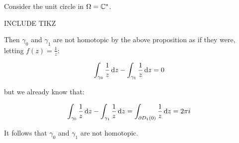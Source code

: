 \begin{example}
Consider the unit circle in $\Omega = \mathbb{C}^*$.

INCLUDE TIKZ

Then $\gamma_0$ and $\gamma_1$ are not homotopic by the above proposition as if they were, letting $f(z) = \frac{1}{z}$:

\begin{align*}
    \int_{\gamma_0} \frac{1}{z} \dif z - \int_{\gamma_1} \frac{1}{z} \dif z = 0
\end{align*}

but we already know that:

\begin{align*}
    \int_{\gamma_0} \frac{1}{z} \dif z - \int_{\gamma_1} \frac{1}{z} \dif z = \int_{\partial D_1(0)} \frac{1}{z} \dif z = 2 \pi i
\end{align*}

It follows that $\gamma_0$ and $\gamma_1$ are not homotopic.
\end{example}

